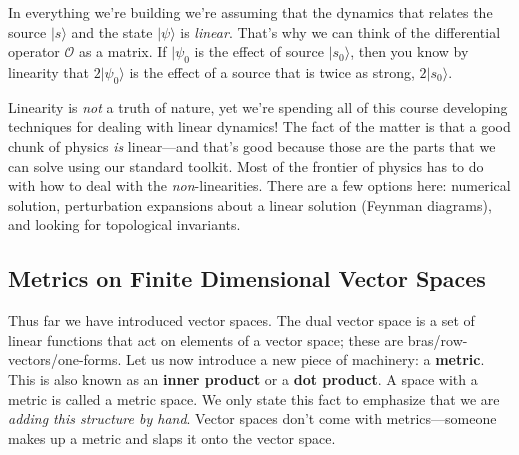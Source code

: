 In everything we're building we're assuming that the dynamics that relates  the source $|s\rangle$ and the state $|\psi\rangle$ is \emph{linear}. That's why we can think of the differential operator $\mathcal O$ as a matrix. If $|\psi_0$ is the effect of source $|s_0\rangle$, then you know by linearity that $2|\psi_0\rangle$ is the effect of a source that is twice as strong, $2|s_0\rangle$. 

Linearity is \emph{not} a truth of nature, yet we're spending all of this course developing techniques for dealing with linear dynamics! The fact of the matter is that a good chunk of physics \emph{is} linear---and that's good because those are the parts that we can solve using our standard toolkit. Most of the frontier of physics has to do with how to deal with the \emph{non}-linearities. There are a few options here: numerical solution, perturbation expansions about a linear solution (Feynman diagrams), and looking for topological invariants. 





\subsection{Metrics on Finite Dimensional Vector Spaces}

Thus far we have introduced vector spaces. The dual vector space is a set of linear functions that act on elements of a vector space; these are bras/row-vectors/one-forms. Let us now introduce a new piece of machinery: a \textbf{metric}. This is also known as an \textbf{inner product} or a \textbf{dot product}. A space with a metric is called a metric space. We only state this fact to emphasize that we are \emph{adding this structure by hand}. Vector spaces don't come with metrics---someone makes up a metric and slaps it onto the vector space.

